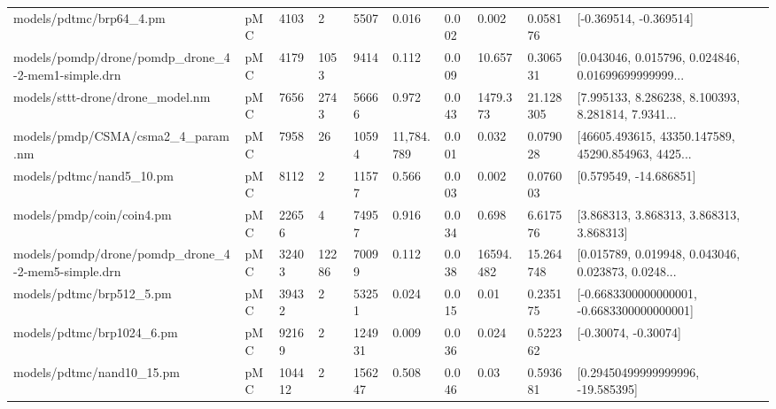 \begin{tabular}{llllllllll}
                           models/pdtmc/brp64\_4.pm &  pMC &   4103 &          2 &        5507 &          0.016 &            0.002 &                        0.002 &       0.058176 &                             [-0.369514, -0.369514] \\
models/pomdp/drone/pomdp\_drone\_4-2-mem1-simple.drn &  pMC &   4179 &       1053 &        9414 &          0.112 &            0.009 &                       10.657 &       0.306531 & [0.043046, 0.015796, 0.024846, 0.01699699999999... \\
                  models/sttt-drone/drone\_model.nm &  pMC &   7656 &       2743 &       56666 &          0.972 &            0.043 &                     1479.373 &      21.128305 & [7.995133, 8.286238, 8.100393, 8.281814, 7.9341... \\
                 models/pmdp/CSMA/csma2\_4\_param.nm &  pMC &   7958 &         26 &       10594 &     11,784.789 &            0.001 &                        0.032 &       0.079028 & [46605.493615, 43350.147589, 45290.854963, 4425... \\
                          models/pdtmc/nand5\_10.pm &  pMC &   8112 &          2 &       11577 &          0.566 &            0.003 &                        0.002 &       0.076003 &                             [0.579549, -14.686851] \\
                         models/pmdp/coin/coin4.pm &  pMC &  22656 &          4 &       74957 &          0.916 &            0.034 &                        0.698 &       6.617576 &           [3.868313, 3.868313, 3.868313, 3.868313] \\
models/pomdp/drone/pomdp\_drone\_4-2-mem5-simple.drn &  pMC &  32403 &      12286 &       70099 &          0.112 &            0.038 &                    16594.482 &      15.264748 & [0.015789, 0.019948, 0.043046, 0.023873, 0.0248... \\
                          models/pdtmc/brp512\_5.pm &  pMC &  39432 &          2 &       53251 &          0.024 &            0.015 &                         0.01 &       0.235175 &         [-0.6683300000000001, -0.6683300000000001] \\
                         models/pdtmc/brp1024\_6.pm &  pMC &  92169 &          2 &      124931 &          0.009 &            0.036 &                        0.024 &       0.522362 &                               [-0.30074, -0.30074] \\
                         models/pdtmc/nand10\_15.pm &  pMC & 104412 &          2 &      156247 &          0.508 &            0.046 &                         0.03 &       0.593681 &                  [0.29450499999999996, -19.585395] \\

\end{tabular}
